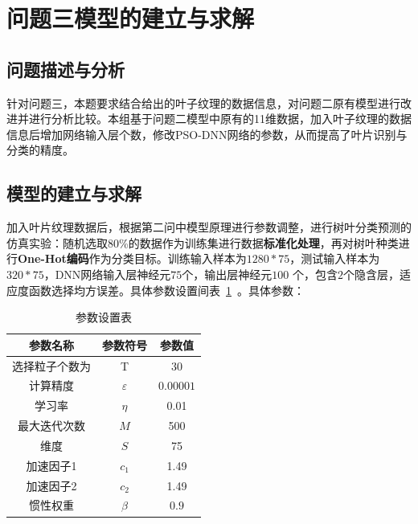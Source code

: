 \documentclass{whutmod}
\begin{document}
	\section{问题三模型的建立与求解}
    \subsection{问题描述与分析}
    针对问题三，本题要求结合给出的叶子纹理的数据信息，对问题二原有模型进行改进并进行分析比较。本组基于问题二模型中原有的11维数据，加入叶子纹理的数据信息后增加网络输入层个数，修改PSO-DNN网络的参数，从而提高了叶片识别与分类的精度。
		
    \subsection{模型的建立与求解}
    加入叶片纹理数据后，根据第二问中模型原理进行参数调整，进行树叶分类预测的仿真实验：随机选取80\%的数据作为训练集进行数据\textbf{标准化处理}，再对树叶种类进行\textbf{One-Hot编码}作为分类目标。训练输入样本为$1280*75$，测试输入样本为$320*75$，DNN网络输入层神经元$75$个，输出层神经元$100$ 个，包含$2$个隐含层，适应度函数选择均方误差。具体参数设置间表~\ref{canshu2}~。具体参数：
    \begin{table}[H]
    	\centering		\caption{参数设置表}\label{canshu2}
    	\begin{tabular}{ccc}
    		\toprule[2pt]
    		\multicolumn{1}{m{4cm}}{\centering 参数名称}
    		& \multicolumn{1}{m{3cm}}{\centering 参数符号}
    		&\multicolumn{1}{m{3cm}}{\centering 参数值}
    		\\
    		\midrule[1pt]
    		选择粒子个数为	 &  T &$30$ \\ 
    		计算精度	 &  $\varepsilon$&$0.00001$  \\ 
    		学习率	 &  $\eta $ &0.01 \\ 
    		最大迭代次数	 &  $M$ &500\\ 
    		维度	 &  $S$ &75 \\ 
    		加速因子1	 &  $c_{1}$ &1.49\\ 
    		加速因子2	 &  $c_{2}$ &1.49 \\ 
    		惯性权重	 &  $\beta $ &$0.9$ \\ 
    		\bottomrule[2pt]	
    	\end{tabular}
        \end{table}
    
\end{document}
